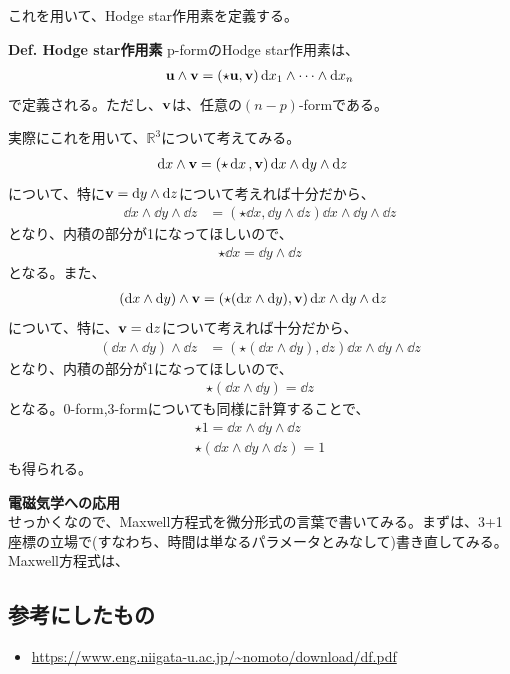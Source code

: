 \documentclass[a4paper,11pt]{jsarticle}
\numberwithin{equation}{section}
\begin{document}
これを用いて、Hodge star作用素を定義する。
\begin{itembox}[l]{\textbf{Def. Hodge star作用素}}
  p-formのHodge star作用素は、
  \begin{align}
    \vb{u} \wedge \vb{v} = (\star \vb{u},\vb{v})\dd{x}_1\wedge \cdots \wedge \dd{x}_n
  \end{align}
  で定義される。ただし、$\vb{v}$は、任意の$(n-p)$-formである。
\end{itembox}
実際にこれを用いて、$\mathbb{R}^3$について考えてみる。
\begin{align}
  \dd{x} \wedge \vb{v} &= (\star \dd{x},\vb{v})\dd{x}\wedge \dd{y}\wedge \dd{z}
\end{align}
について、特に$\vb{v} = \dd{y} \wedge \dd{z}$について考えれば十分だから、
\begin{align}
  \dd{x} \wedge \dd{y} \wedge \dd{z} &= (\star \dd{x},\dd{y} \wedge \dd{z})\dd{x}\wedge \dd{y}\wedge \dd{z}
\end{align}
となり、内積の部分が1になってほしいので、
\begin{align}
  \star \dd{x} = \dd{y} \wedge \dd{z}
\end{align}
となる。また、
\begin{align}
  (\dd{x} \wedge \dd{y} ) \wedge \vb{v} &= (\star (\dd{x} \wedge \dd{y}),\vb{v})\dd{x}\wedge \dd{y}\wedge \dd{z}
\end{align}
について、特に、$\vb{v} = \dd{z}$について考えれば十分だから、
\begin{align}
  (\dd{x} \wedge \dd{y} ) \wedge \dd{z} &= (\star (\dd{x} \wedge \dd{y}),\dd{z})\dd{x}\wedge \dd{y}\wedge \dd{z}
\end{align}
となり、内積の部分が1になってほしいので、
\begin{align}
  \star (\dd{x} \wedge \dd{y}) = \dd{z}
\end{align}
となる。0-form,3-formについても同様に計算することで、
\begin{align}
  \star 1 = \dd{x}\wedge \dd{y}\wedge \dd{z}\\
  \star( \dd{x} \wedge \dd{y} \wedge \dd{z}) = 1
\end{align}
も得られる。

\textbf{電磁気学への応用}\\
せっかくなので、Maxwell方程式を微分形式の言葉で書いてみる。まずは、3+1座標の立場で(すなわち、時間は単なるパラメータとみなして)書き直してみる。Maxwell方程式は、



\subsection{参考にしたもの}
\begin{itemize}
  \item \url{https://www.eng.niigata-u.ac.jp/~nomoto/download/df.pdf}
\end{itemize}
\end{document}
